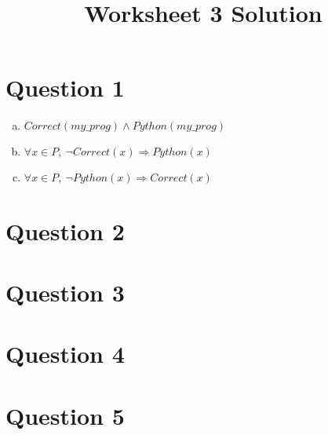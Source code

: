 \documentclass[12pt]{article}
\begin{document}
\title{Worksheet 3 Solution}
\maketitle

\section*{Question 1}

\begin{enumerate}[a)]
    \item
        $Correct(my\_prog) \land Python(my\_prog)$
    \item
        $\forall x \in P,\: \neg Correct(x) \Rightarrow Python(x)$
    \item
        $\forall x \in P,\: \neg Python(x) \Rightarrow Correct(x)$
\end{enumerate}

\section*{Question 2}

\section*{Question 3}

\section*{Question 4}

\section*{Question 5}
\end{document}
